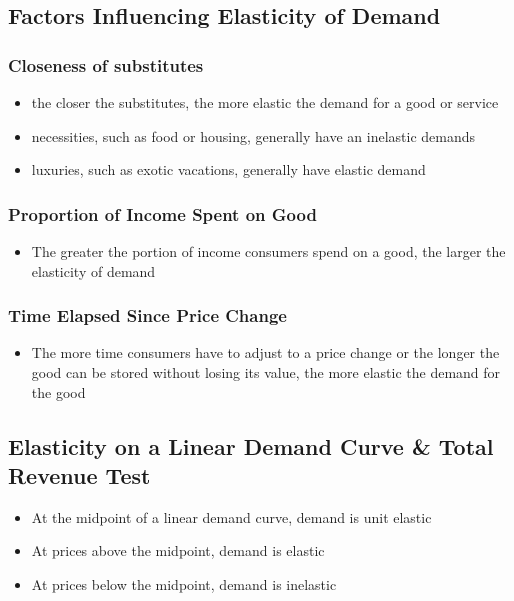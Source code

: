 \documentclass[11pt]{article}
\begin{document}
\subsection{Factors Influencing Elasticity of Demand}
\label{sec:org7521366}
\subsubsection{Closeness of substitutes}
\label{sec:org7d7f58a}
\begin{itemize}
\item the closer the substitutes, the more elastic the demand for a good or service
\item necessities, such as food or housing, generally have an inelastic demands
\item luxuries, such as exotic vacations, generally have elastic demand
\end{itemize}
\subsubsection{Proportion of Income Spent on Good}
\label{sec:org17339ac}
\begin{itemize}
\item The greater the portion of income consumers spend on a good, the larger the elasticity of demand
\end{itemize}
\subsubsection{Time Elapsed Since Price Change}
\label{sec:orgac42519}
\begin{itemize}
\item The more time consumers have to adjust to a price change or the longer the good can be stored
without losing its value, the more elastic the demand for the good
\end{itemize}
\subsection{Elasticity on a Linear Demand Curve \& Total Revenue Test}
\label{sec:org544435e}
\begin{itemize}
\item At the midpoint of a linear demand curve, demand is unit elastic
\item At prices above the midpoint, demand is elastic
\item At prices below the midpoint, demand is inelastic
\end{itemize}
\end{document}

